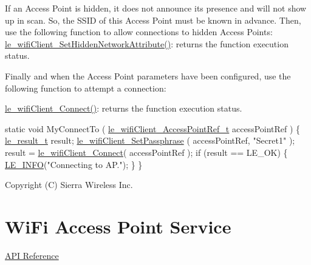 If an Access Point is hidden, it does not announce its presence and will not show up in scan. So, the S\+S\+ID of this Access Point must be known in advance. Then, use the following function to allow connections to hidden Access Points\+: \hyperlink{le__wifi_client__interface_8h_a1d150a261039641255c6fce638f91c97}{le\+\_\+wifi\+Client\+\_\+\+Set\+Hidden\+Network\+Attribute()}\+: returns the function execution status.

Finally and when the Access Point parameters have been configured, use the following function to attempt a connection\+:
\begin{DoxyItemize}
\item \hyperlink{le__wifi_client__interface_8h_a17963642c794a003627dde66776ba225}{le\+\_\+wifi\+Client\+\_\+\+Connect()}\+: returns the function execution status.
\end{DoxyItemize}


\begin{DoxyCode}
\textcolor{keyword}{static} \textcolor{keywordtype}{void} MyConnectTo
(
    \hyperlink{le__wifi_client__interface_8h_a5a5709045b59550dbb52ff13a7d24c1e}{le\_wifiClient\_AccessPointRef\_t} accessPointRef
)
\{
    \hyperlink{le__basics_8h_a1cca095ed6ebab24b57a636382a6c86c}{le\_result\_t} result;
    \hyperlink{le__wifi_client__interface_8h_a398b877814bde1cd3054f2f59d0f6b8b}{le\_wifiClient\_SetPassphrase} ( accessPointRef, \textcolor{stringliteral}{"Secret1"} );
    result = \hyperlink{le__wifi_client__interface_8h_a17963642c794a003627dde66776ba225}{le\_wifiClient\_Connect}( accessPointRef );
    \textcolor{keywordflow}{if} (result == LE\_OK)
    \{
         \hyperlink{le__log_8h_a23e6d206faa64f612045d688cdde5808}{LE\_INFO}(\textcolor{stringliteral}{"Connecting to AP."});
    \}
\}
\end{DoxyCode}






Copyright (C) Sierra Wireless Inc. \hypertarget{c_le_wifi_ap}{}\section{Wi\+Fi Access Point Service}\label{c_le_wifi_ap}
\hyperlink{le__wifi_ap__interface_8h}{A\+PI Reference}





